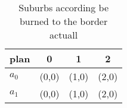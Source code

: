 \documentclass[a4paper]{article}
\begin{document}
\begin{table}
\begin{adjustbox}{width=0.6\columnwidth}
\begin{tabular}{|l|l|l|l|}
\hline
\textbf{plan} & \multicolumn{1}{c|}{\textbf{0}} & \multicolumn{1}{c|}{\textbf{1}} & \multicolumn{1}{c|}{\textbf{2}} \\ \hline
\textbf{$a_0$}  & (0,0) & (1,0) & (2,0) \\ \hline
\textbf{$a_1$}  & (0,0) & (1,0) & (2,0) \\ \hline
\end{tabular}
\end{adjustbox}
\caption{Suburbs according be burned to the border actuall
}
\end{table}
\end{document}
